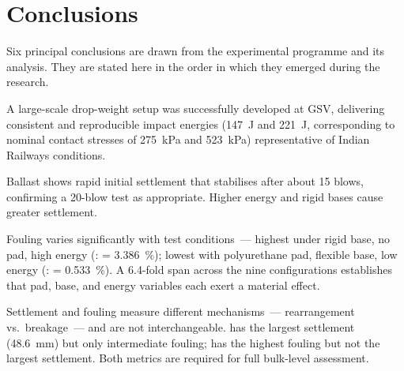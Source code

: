 \section{Conclusions}
\label{sec:concl-main}

Six principal conclusions are drawn from the experimental programme and
its analysis. They are stated here in the order in which they emerged
during the research.

\begin{finding}[title=Conclusion 1 -- Apparatus]
A large-scale drop-weight setup was successfully developed at \gls{GSV},
delivering consistent and reproducible impact energies (\SI{147}{\joule}
and \SI{221}{\joule}, corresponding to nominal contact stresses of
\SI{275}{\kilo\pascal} and \SI{523}{\kilo\pascal}) representative of
Indian Railways conditions.
\end{finding}

\begin{finding}[title=Conclusion 2 -- Settlement]
Ballast shows rapid initial settlement that stabilises after about 15
blows, confirming a 20-blow test as appropriate. Higher energy and rigid
bases cause greater settlement.
\end{finding}

\begin{finding}[title=Conclusion 3 -- Fouling]
Fouling varies significantly with test conditions~--- highest under rigid
base, no pad, high energy (: \FIIN{} = \SI{3.386}{\percent});
lowest with polyurethane pad, flexible base, low energy (:
\FIIN{} = \SI{0.533}{\percent}). A 6.4-fold span across the nine
configurations establishes that pad, base, and energy variables each
exert a material effect.
\end{finding}

\begin{finding}[title=Conclusion 4 -- Settlement vs.\ fouling]
Settlement and fouling measure different mechanisms~--- rearrangement vs.\
breakage~--- and are not interchangeable.  has the largest
settlement (\SI{48.6}{\milli\metre}) but only intermediate fouling;
\testlabel{T7} has the highest fouling but not the largest settlement.
Both metrics are required for full bulk-level assessment.
\end{finding}

